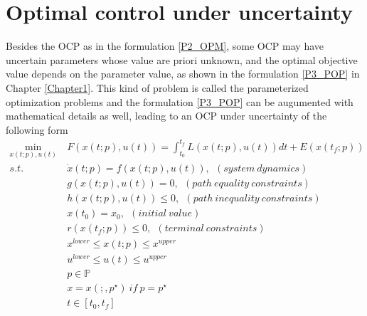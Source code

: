 \documentclass  [
  paper    = a4,
  BCOR     = 10mm,
  twoside,
  fontsize = 12pt,
  fleqn,
  toc      = bibnumbered,
  toc      = listofnumbered,
  numbers  = noendperiod,
  headings = normal,
  listof   = leveldown,
  version  = 3.03
]                                       {scrreprt}
\newcommand{\<}{\langle}
\renewcommand{\>}{\rangle}
\begin{document}
\chapter{Optimal control under uncertainty}
\label{Chapter3}
Besides the OCP as in the formulation \ref{P2_OPM}, some OCP may have uncertain parameters whose value are priori unknown, and the optimal objective value depends on the parameter value, as shown in the formulation \ref{P3_POP} in Chapter \ref{Chapter1}. This kind of problem is called the parameterized optimization problems and the formulation \ref{P3_POP}  can be augumented with mathematical details as well, leading to an OCP under uncertainty of the following form
	\begin{subequations}
	\begin{align}
		\underset{x(t;p), u(t)}{\text{min}}   \ &  F(x(t;p), u(t))  = \int_{t_0}^{t_f}L(x(t;p), u(t))dt + E (x(t_f;p)) \label{P4_cost} \\
		s.t.\ \ &  \dot{x} (t;p) = f(x(t;p), u(t)), \ \ (system \ dynamics)   \label{P4_sd} \\
		& g(x(t;p), u(t)) = 0, \ \  (path\  equality\  constraints)  \label{P4_ec}\\
		& h(x(t;p), u(t)) \leq 0, \ \ (path\  inequality \ constraints)  \label{P4_inc}\\
		& x(t_0) = x_0, \ \ (initial \ value) \\
		& r(x(t_f; p)) \leq 0, \ \ (terminal \ constraints)  \label{P4_final} \\
		& x^{lower} \leq x(t;p) \leq x^{upper}   \label{P4_box_x} \\ 
		& u^{lower} \leq u(t) \leq u^{upper}   \label{P4_box_u} \\ 
		& p  \in   \mathbb{P}  \\
		& x = x(;,p^\star) \ if \ p = p^\star \\
		& t \in [t_0, t_f]
	\end{align}
	\label{P4_OCPPara}
\end{subequations}  
\end{document}
